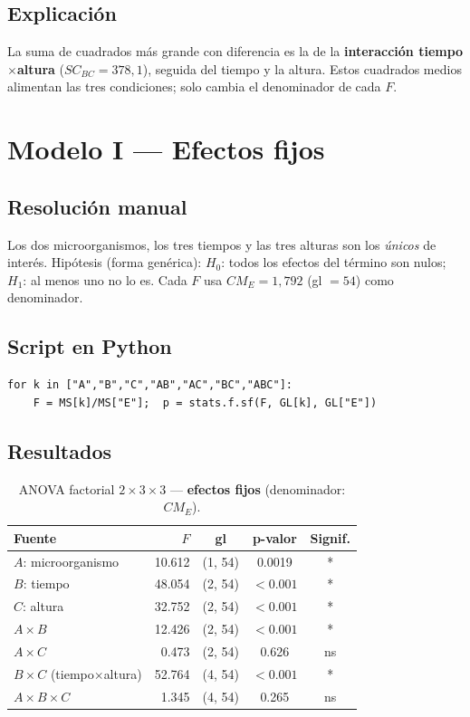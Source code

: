 \documentclass[12pt,a4paper]{article}
\begin{document}
\subsection{Explicación}

La suma de cuadrados más grande con diferencia es la de la \textbf{interacción tiempo$\times$altura} ($SC_{BC}=378{,}1$), seguida del tiempo y la altura. Estos cuadrados medios alimentan las tres condiciones; solo cambia el denominador de cada $F$.

\section{Modelo I --- Efectos fijos}

\subsection{Resolución manual}

Los dos microorganismos, los tres tiempos y las tres alturas son los \emph{únicos} de interés. Hipótesis (forma genérica): $H_0$: todos los efectos del término son nulos; $H_1$: al menos uno no lo es. Cada $F$ usa $CM_E=1{,}792$ (gl $=54$) como denominador.

\subsection{Script en Python}

\begin{lstlisting}[caption={Pruebas F del modelo de efectos fijos (todo contra el error).}]
for k in ["A","B","C","AB","AC","BC","ABC"]:
    F = MS[k]/MS["E"];  p = stats.f.sf(F, GL[k], GL["E"])
\end{lstlisting}

\subsection{Resultados}

\begin{table}[H]
\centering
\caption{ANOVA factorial $2\times3\times3$ --- \textbf{efectos fijos} (denominador: $CM_E$).}
\begin{tabular}{lrccc}
\toprule
\textbf{Fuente} & \textbf{$F$} & \textbf{gl} & \textbf{p-valor} & \textbf{Signif.}\\
\midrule
$A$: microorganismo            & 10.612 & (1, 54) & 0.0019 & *\\
$B$: tiempo                    & 48.054 & (2, 54) & $<0.001$ & *\\
$C$: altura                    & 32.752 & (2, 54) & $<0.001$ & *\\
$A\times B$                    & 12.426 & (2, 54) & $<0.001$ & *\\
$A\times C$                    & 0.473  & (2, 54) & 0.626  & ns\\
$B\times C$ (tiempo$\times$altura) & 52.764 & (4, 54) & $<0.001$ & *\\
$A\times B\times C$            & 1.345  & (4, 54) & 0.265  & ns\\
\bottomrule
\end{tabular}
\end{table}
\end{document}
